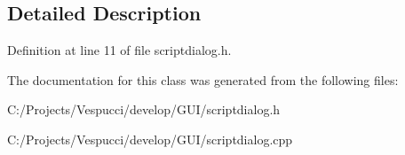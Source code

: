 \subsection{Detailed Description}


Definition at line 11 of file scriptdialog.\+h.



The documentation for this class was generated from the following files\+:\begin{DoxyCompactItemize}
\item 
C\+:/\+Projects/\+Vespucci/develop/\+G\+U\+I/scriptdialog.\+h\item 
C\+:/\+Projects/\+Vespucci/develop/\+G\+U\+I/scriptdialog.\+cpp\end{DoxyCompactItemize}
